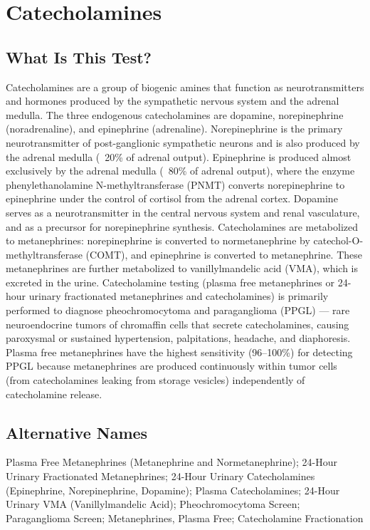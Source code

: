 \chapter{Catecholamines}

\section*{What Is This Test?}
Catecholamines are a group of biogenic amines that function as neurotransmitters and hormones produced by the sympathetic nervous system and the adrenal medulla. The three endogenous catecholamines are dopamine, norepinephrine (noradrenaline), and epinephrine (adrenaline). Norepinephrine is the primary neurotransmitter of post-ganglionic sympathetic neurons and is also produced by the adrenal medulla (~20\% of adrenal output). Epinephrine is produced almost exclusively by the adrenal medulla (~80\% of adrenal output), where the enzyme phenylethanolamine N-methyltransferase (PNMT) converts norepinephrine to epinephrine under the control of cortisol from the adrenal cortex. Dopamine serves as a neurotransmitter in the central nervous system and renal vasculature, and as a precursor for norepinephrine synthesis. Catecholamines are metabolized to metanephrines: norepinephrine is converted to normetanephrine by catechol-O-methyltransferase (COMT), and epinephrine is converted to metanephrine. These metanephrines are further metabolized to vanillylmandelic acid (VMA), which is excreted in the urine. Catecholamine testing (plasma free metanephrines or 24-hour urinary fractionated metanephrines and catecholamines) is primarily performed to diagnose pheochromocytoma and paraganglioma (PPGL) --- rare neuroendocrine tumors of chromaffin cells that secrete catecholamines, causing paroxysmal or sustained hypertension, palpitations, headache, and diaphoresis. Plasma free metanephrines have the highest sensitivity (96--100\%) for detecting PPGL because metanephrines are produced continuously within tumor cells (from catecholamines leaking from storage vesicles) independently of catecholamine release.

\section*{Alternative Names}
Plasma Free Metanephrines (Metanephrine and Normetanephrine); 24-Hour Urinary Fractionated Metanephrines; 24-Hour Urinary Catecholamines (Epinephrine, Norepinephrine, Dopamine); Plasma Catecholamines; 24-Hour Urinary VMA (Vanillylmandelic Acid); Pheochromocytoma Screen; Paraganglioma Screen; Metanephrines, Plasma Free; Catecholamine Fractionation

